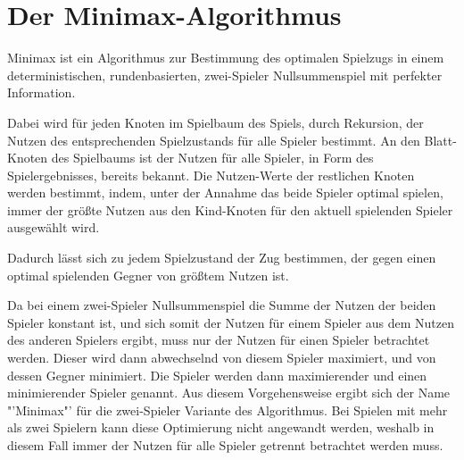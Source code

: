 \section{Der Minimax-Algorithmus}

Minimax ist ein Algorithmus zur Bestimmung des optimalen Spielzugs in einem deterministischen, rundenbasierten, zwei-Spieler Nullsummenspiel mit perfekter Information.

Dabei wird für jeden Knoten im Spielbaum des Spiels, durch Rekursion, der Nutzen des entsprechenden Spielzustands für alle Spieler bestimmt.
An den Blatt-Knoten des Spielbaums ist der Nutzen für alle Spieler, in Form des Spielergebnisses, bereits bekannt.
Die Nutzen-Werte der restlichen Knoten werden bestimmt, indem, unter der Annahme das beide Spieler optimal spielen, immer der größte Nutzen aus den Kind-Knoten für den aktuell spielenden Spieler ausgewählt wird.
\cite[S.~165]{ai2010russel}

Dadurch lässt sich zu jedem Spielzustand der Zug bestimmen, der gegen einen optimal spielenden Gegner von größtem Nutzen ist.

Da bei einem zwei-Spieler Nullsummenspiel die Summe der Nutzen der beiden Spieler konstant ist, und sich somit der Nutzen für einem Spieler aus dem Nutzen des anderen Spielers ergibt, muss nur der Nutzen für einen Spieler betrachtet werden. Dieser wird dann abwechselnd von diesem Spieler maximiert, und von dessen Gegner minimiert.
Die Spieler werden dann maximierender und einen minimierender Spieler genannt.
Aus diesem Vorgehensweise ergibt sich der Name "'Minimax"' für die zwei-Spieler Variante des Algorithmus.
Bei Spielen mit mehr als zwei Spielern kann diese Optimierung nicht angewandt werden, weshalb in diesem Fall immer der Nutzen für alle Spieler getrennt betrachtet werden muss.
\cite[S.~165]{ai2010russel}




